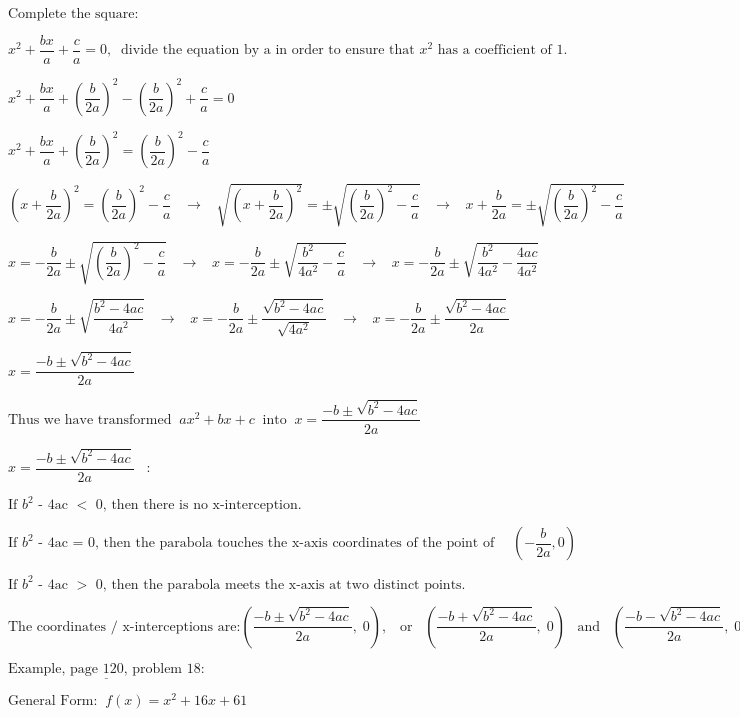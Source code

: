 \documentclass[12pt]{article}
\begin{document}
$\text{Complete the square:}$

$x^2 + \dfrac{bx}{a} + \dfrac{c}{a} = 0, \;\; \text{divide the equation by a in order to ensure that $x^2$ has a coefficient of 1.}$

$x^2 + \dfrac{bx}{a} + \left(\dfrac{b}{2a}\right)^2 - \left(\dfrac{b}{2a}\right)^2 + \dfrac{c}{a} = 0$

$x^2 + \dfrac{bx}{a} + \left(\dfrac{b}{2a}\right)^2 = \left(\dfrac{b}{2a}\right)^2 - \dfrac{c}{a}$

$\left(x + \dfrac{b}{2a}\right)^2 = \left(\dfrac{b}{2a}\right)^2 - \dfrac{c}{a} \;\;\; \rightarrow \;\;\; \sqrt{\left(x + \dfrac{b}{2a}\right)^2} = \pm \sqrt{\left(\dfrac{b}{2a}\right)^2 - \dfrac{c}{a}} \;\;\; \rightarrow \;\;\; x + \dfrac{b}{2a} = \pm \sqrt{\left(\dfrac{b}{2a}\right)^2 - \dfrac{c}{a}}$

$x = -\dfrac{b}{2a} \pm \sqrt{\left(\dfrac{b}{2a}\right)^2 - \dfrac{c}{a}} \;\;\; \rightarrow \;\;\; x = -\dfrac{b}{2a} \pm \sqrt{\dfrac{b^2}{4a^2} - \dfrac{c}{a}} \;\;\; \rightarrow \;\;\; x = -\dfrac{b}{2a} \pm \sqrt{\dfrac{b^2}{4a^2} - \dfrac{4ac}{4a^2}}$

$x = -\dfrac{b}{2a} \pm \sqrt{\dfrac{b^2 - 4ac}{4a^2}} \;\;\; \rightarrow \;\;\; x = -\dfrac{b}{2a} \pm \dfrac{\sqrt{b^2 - 4ac}}{\sqrt{4a^2}} \;\;\; \rightarrow \;\;\; x = -\dfrac{b}{2a} \pm \dfrac{\sqrt{b^2 - 4ac}}{2a}$

$x = \dfrac{-b \pm \sqrt{b^2 - 4ac}}{2a}$

$\text{Thus we have transformed} \;\; ax^2 + bx + c \;\; \text{into} \;\; x = \dfrac{-b \pm \sqrt{b^2 - 4ac}}{2a}$

$x = \dfrac{-b \pm \sqrt{b^2 - 4ac}}{2a} \;\;\; :$

$\text{If $b^2$ - 4ac $<$ 0, then there is no x-interception.}$

$\text{If $b^2$ - 4ac = 0, then the parabola touches the x-axis coordinates of the point of contact at:} \left(-\dfrac{b}{2a}, 0 \right)$

$\text{If $b^2$ - 4ac $>$ 0, then the parabola meets the x-axis at two distinct points.}$

$\text{The coordinates / x-interceptions are:} \left(\dfrac{-b \pm \sqrt{b^2 - 4ac}}{2a},\; 0 \right), \;\;\; \text{or} \;\;\; \left(\dfrac{-b + \sqrt{b^2 - 4ac}}{2a},\; 0 \right) \;\;\; \text{and} \;\;\; \left(\dfrac{-b - \sqrt{b^2 - 4ac}}{2a},\; 0 \right)$

$\underline{\text{Example, page 120, problem 18:}}$

$\text{General Form:} \;\; f(x) = x^2 + 16x + 61$
\end{document}
